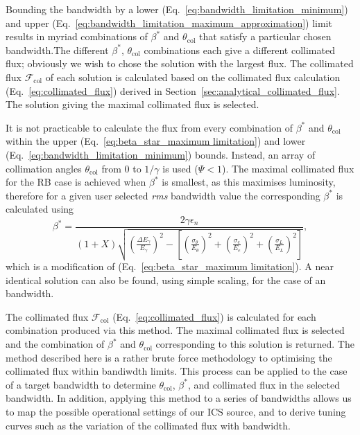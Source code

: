 \documentclass[../main.tex]{subfiles}
\begin{document}
Bounding the  bandwidth by a lower (Eq.~\ref{eq:bandwidth_limitation_minimum}) and upper (Eq.~\ref{eq:bandwidth_limitation_maximum_approximation}) limit results in myriad combinations of $\beta^{*}$ and $\theta_{\mathrm{col}}$ that satisfy a particular chosen bandwidth.The different $\beta^{*}$, $\theta_{\mathrm{col}}$ combinations each give a different collimated flux; obviously we wish to chose the solution with the largest flux. The collimated flux $\mathcal{F}_{\mathrm{col}}$ of each solution is calculated based on the collimated flux calculation (Eq.~\ref{eq:collimated_flux}) derived in Section~\ref{sec:analytical_collimated_flux}. The solution giving the maximal collimated flux is selected. 

It is not practicable to calculate the flux from every combination of $\beta^{*}$ and $\theta_{\mathrm{col}}$ within the upper (Eq.~\ref{eq:beta_star_maximum limitation}) and lower (Eq.~\ref{eq:bandwidth_limitation_minimum}) bounds. Instead, an array of collimation angles $\theta_{\mathrm{col}}$ from 0 to $1/\gamma$ is used ($\Psi<1$). The maximal collimated flux for the RB case is achieved when $\beta^{*}$ is smallest, as this maximises luminosity, therefore for a given user selected \textit{rms} bandwidth value the corresponding $\beta^{*}$ is calculated using
\begin{equation}
\beta^{*} = \frac{2\gamma\epsilon_{n}}{\left(1+X\right)\sqrt{\left(\frac{\Delta E_{\gamma}}{E_{\gamma}}\right)^{2}-\left[\left(\frac{\sigma_{\theta}}{E_{\theta}}\right)^{2}+\left(\frac{\sigma_{e}}{E_{e}}\right)^{2}+\left(\frac{\sigma_{L}}{E_{L}}\right)^{2}\right]}},
\label{eq:beta_star_round_beam}
\end{equation}
which is a modification of (Eq.~\ref{eq:beta_star_maximum limitation}). A near identical solution can also be found, using simple scaling, for the case of an  bandwidth. 

The collimated flux $\mathcal{F}_{\mathrm{col}}$ (Eq.~\ref{eq:collimated_flux}) is calculated for each combination produced via this method. The maximal collimated flux is selected and the combination of $\beta^{*}$ and $\theta_{\mathrm{col}}$ corresponding to this solution is returned. The method described here is a rather brute force methodology to optimising the collimated flux within bandiwdth limits. This process can be applied to the case of a target bandwidth to determine $\theta_{\mathrm{col}}$, $\beta^{*}$, and collimated flux in the selected bandwidth. In addition, applying this method to a series of bandwidths allows us to map the possible operational settings of our ICS source, and to derive tuning curves such as the variation of the collimated flux with bandwidth.
\end{document}
